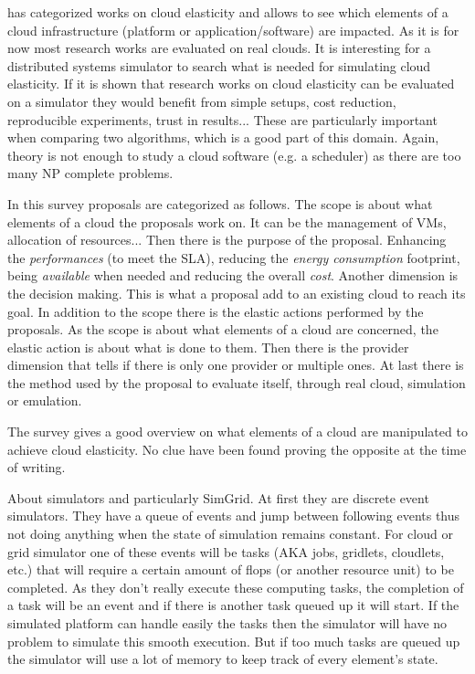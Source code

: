 \documentclass[a4paper, onecolumn, 11pt]{article}
\begin{document}
  
  \cite{Naskos2016} has categorized works on cloud elasticity and allows to see
  which elements of a cloud infrastructure (platform or application/software)
  are impacted. As it is for now most research works are evaluated on real
  clouds. It is interesting for a distributed systems simulator to search what
  is needed for simulating cloud elasticity. If it is shown that research works
  on cloud elasticity can be evaluated on a simulator they would benefit from
  simple setups, cost reduction, reproducible experiments, trust in results... 
  These are particularly important when comparing two algorithms, which is a
  good part of this domain. Again, theory is not enough to study a cloud
  software (e.g. a scheduler) as there are too many NP complete problems.
  
  In this survey proposals are categorized as follows. The scope is about what
  elements of a cloud the proposals work on. It can be the management of VMs,
  allocation of resources... Then there is the purpose of the proposal.
  Enhancing the \textit{performances} (to meet the SLA), reducing the
  \textit{energy consumption} footprint, being \textit{available} when needed
  and reducing the overall \textit{cost}. Another dimension is the decision
  making. This is what a proposal add to an existing cloud to reach its goal. In
  addition to the scope there is the elastic actions performed by the proposals.
  As the scope is about what elements of a cloud are concerned, the elastic
  action is about what is done to them. Then there is the provider dimension
  that tells if there is only one provider or multiple ones. At last there is
  the method used by the proposal to evaluate itself, through real cloud,
  simulation or emulation.
  
  The survey gives a good overview on what elements of a cloud are manipulated
  to achieve cloud elasticity. No clue have been found proving the opposite at
  the time of writing.
  
  About simulators and particularly SimGrid. At first they are discrete event 
  simulators. They have a queue of events and jump between following events 
  thus not doing anything when the state of simulation remains constant. For 
  cloud or grid simulator one of these events will be tasks (AKA jobs, 
  gridlets, cloudlets, etc.) that will require a certain amount of flops (or 
  another resource unit) to be completed. As they don't really execute these 
  computing tasks, the completion of a task will be an event and if there is 
  another task queued up it will start. If the simulated platform can handle 
  easily the tasks then the simulator will have no problem to simulate this 
  smooth execution. But if too much tasks are queued up the simulator will use 
  a lot of memory to keep track of every element's state.
    
\end{document}

